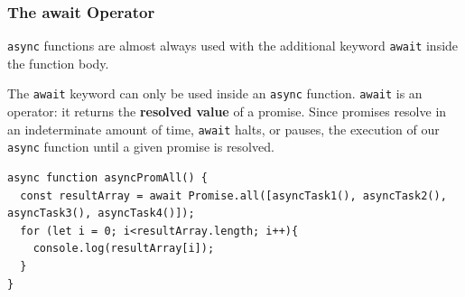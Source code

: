 \documentclass[a4paper, 12pt]{article}
\begin{document}
\subsubsection{The await Operator}
\verb|async| functions are almost always used with the additional keyword \verb|await| inside the function body.

The \verb|await| keyword can only be used inside an \verb|async| function. \verb|await| is an operator: it returns the \textbf{resolved value} of a promise. Since promises resolve in an indeterminate amount of time, \verb|await| halts, or pauses, the execution of our \verb|async| function until a given promise is resolved.
\begin{verbatim}
async function asyncPromAll() {
  const resultArray = await Promise.all([asyncTask1(), asyncTask2(), 
asyncTask3(), asyncTask4()]);
  for (let i = 0; i<resultArray.length; i++){
    console.log(resultArray[i]); 
  }
}
\end{verbatim}
\end{document}
